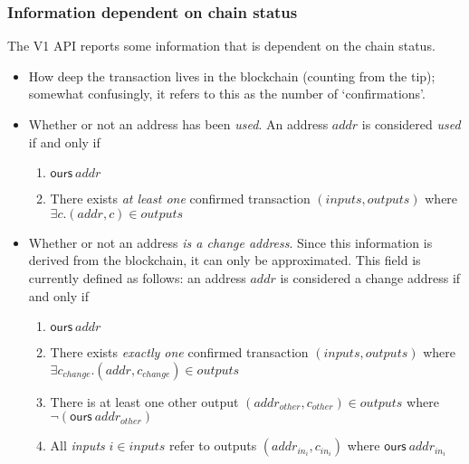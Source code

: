 \documentclass{article}
\numberwithin{equation}{lemma}
\begin{document}
\subsubsection{Information dependent on chain status}
\label{sec:confirmations}

The V1 API reports some information that is dependent on the chain status.

\begin{itemize}
\item How deep the transaction lives in the blockchain (counting from the tip);
somewhat confusingly, it refers to this as the number of `confirmations'.
\item Whether or not an address has been \emph{used}. An address
$\mathit{addr}$ is considered \emph{used} if and only if
\begin{enumerate}
  \item $\mathsf{ours} ~ \mathit{addr}$
  \item There exists \emph{at least one} confirmed transaction $(\mathit{inputs}, \mathit{outputs})$ where $\exists c. (\mathit{addr}, c) \in \mathit{outputs}$
\end{enumerate}
\item Whether or not an address \emph{is a change address}. Since this
information is derived from the blockchain, it can only be approximated. This
field is currently defined as follows: an address $\mathit{addr}$ is considered
a change address if and only if
\begin{enumerate}
  \item $\mathsf{ours} ~ \mathit{addr}$
  \item There exists \emph{exactly one} confirmed transaction $(\mathit{inputs},
  \mathit{outputs})$ where $\exists c_\mathit{change}. (\mathit{addr}, c_\mathit{change}) \in \mathit{outputs}$
  \item There is at least one other output $(\mathit{addr}_\mathit{other}, c_\mathit{other}) \in \mathit{outputs}$ where $\neg (\mathsf{ours} ~ \mathit{addr}_\mathit{other})$
  \item All \emph{inputs} $i \in \mathit{inputs}$ refer to outputs $(\mathit{addr}_{\mathit{in}_i}, c_{\mathit{in}_i})$ where $\mathsf{ours} ~ \mathit{addr}_{\mathit{in}_i}$
\end{enumerate}
\end{itemize}
\end{document}
